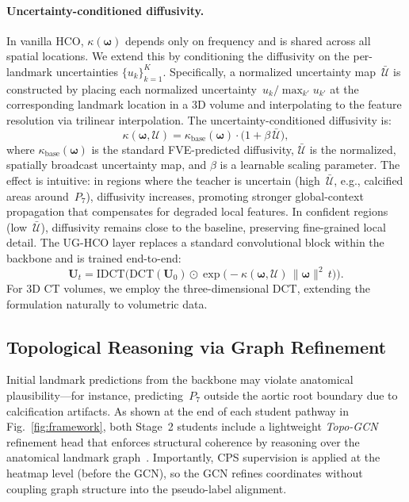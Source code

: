 \documentclass[conference]{IEEEtran}
\begin{document}
\paragraph{Uncertainty-conditioned diffusivity.}
In vanilla HCO, $\kappa(\boldsymbol{\omega})$ depends only on frequency and is shared across all spatial locations. We extend this by conditioning the diffusivity on the per-landmark uncertainties $\{u_k\}_{k=1}^K$. Specifically, a normalized uncertainty map~$\bar{\mathcal{U}}$ is constructed by placing each normalized uncertainty~$u_k / \max_{k'} u_{k'}$ at the corresponding landmark location in a 3D volume and interpolating to the feature resolution via trilinear interpolation. The uncertainty-conditioned diffusivity is:
\begin{equation}
  \kappa(\boldsymbol{\omega}, \mathcal{U})
    = \kappa_{\mathrm{base}}(\boldsymbol{\omega})\cdot
      \bigl(1 + \beta\,\bar{\mathcal{U}}\bigr),
  \label{eq:ughco_diff}
\end{equation}
where $\kappa_{\mathrm{base}}(\boldsymbol{\omega})$ is the standard FVE-predicted diffusivity, $\bar{\mathcal{U}}$ is the normalized, spatially broadcast uncertainty map, and $\beta$ is a learnable scaling parameter. The effect is intuitive: in regions where the teacher is uncertain (high~$\bar{\mathcal{U}}$, e.g., calcified areas around~$P_7$), diffusivity increases, promoting stronger global-context propagation that compensates for degraded local features. In confident regions (low~$\bar{\mathcal{U}}$), diffusivity remains close to the baseline, preserving fine-grained local detail. The UG-HCO layer replaces a standard convolutional block within the backbone and is trained end-to-end:
\begin{equation}
  \mathbf{U}_t = \mathrm{IDCT}\!\bigl(
    \mathrm{DCT}(\mathbf{U}_0)
    \odot \exp\!\bigl(-\kappa(\boldsymbol{\omega}, \mathcal{U})\,\|\boldsymbol{\omega}\|^2\,t\bigr)
  \bigr).
  \label{eq:ughco_layer}
\end{equation}
For 3D CT volumes, we employ the three-dimensional DCT, extending the formulation naturally to volumetric data.

\subsection{Topological Reasoning via Graph Refinement}
\label{sec:gcn}

Initial landmark predictions from the backbone may violate anatomical plausibility---for instance, predicting~$P_7$ outside the aortic root boundary due to calcification artifacts. As shown at the end of each student pathway in Fig.~\ref{fig:framework}, both Stage~2 students include a lightweight \emph{Topo-GCN} refinement head that enforces structural coherence by reasoning over the anatomical landmark graph~\cite{Li2020_structured_landmark}. Importantly, CPS supervision is applied at the heatmap level (before the GCN), so the GCN refines coordinates without coupling graph structure into the pseudo-label alignment.
\end{document}

